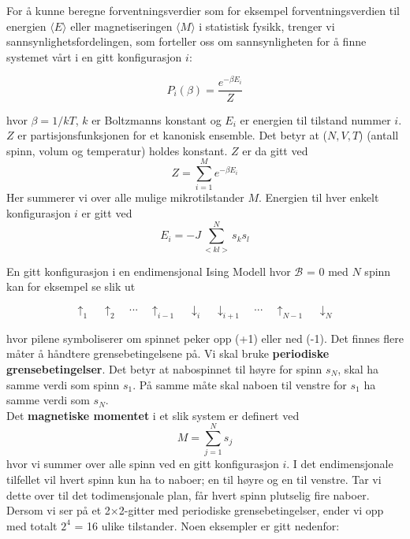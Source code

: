 \documentclass[11pt,a4paper]{article}
\begin{document}
For å kunne beregne forventningsverdier som for eksempel forventningsverdien til energien $\langle E \rangle$ eller magnetiseringen $\langle M \rangle$ i statistisk fysikk, trenger vi sannsynlighetsfordelingen, som forteller oss om sannsynligheten for å finne systemet vårt i en gitt konfigurasjon $i$:

\begin{equation}
P_i(\beta) = \frac{e^{-\beta E_i}}{Z}
\end{equation}

hvor $\beta = 1/kT$, $k$ er Boltzmanns konstant og $E_i$ er energien til tilstand nummer $i$. $Z$ er partisjonsfunksjonen for et kanonisk ensemble. Det betyr at ($N,V,T$) (antall spinn, volum og temperatur) holdes konstant. $Z$ er da gitt ved
\begin{equation}
Z = \sum_{i=1}^M e^{-\beta E_i }
\end{equation}
Her summerer vi over alle mulige mikrotilstander $M$. Energien til hver enkelt konfigurasjon $i$ er gitt ved
\begin{equation}
E_i = -J\sum_{<kl>}^N s_k s_l
\end{equation}

En gitt konfigurasjon i en endimensjonal Ising Modell hvor $\mathcal{B}$ = 0 med $N$ spinn kan for eksempel se slik ut

\[\uparrow_1 \quad \uparrow_2 \quad  ... \quad \uparrow_{i-1}  \quad \downarrow_i  \quad \downarrow_{i+1} \quad ...\quad \uparrow_{N-1} \quad \downarrow_N \]

hvor pilene symboliserer om spinnet peker opp (+1) eller ned (-1). Det finnes flere måter å håndtere grensebetingelsene på. Vi skal bruke \textbf{periodiske grensebetingelser}. Det betyr at nabospinnet til høyre for spinn $s_N$, skal ha samme verdi som spinn $s_1$. På samme måte skal naboen til venstre for $s_1$ ha samme verdi som $s_N$. \\

Det \textbf{magnetiske momentet} i et slik system er definert ved 
\begin{equation}
M = \sum_{j=1} ^N s_j
\end{equation}
hvor vi summer over alle spinn ved en gitt konfigurasjon $i$. I det endimensjonale tilfellet vil hvert spinn kun ha to naboer; en til høyre og en til venstre. Tar vi dette over til det todimensjonale plan, får hvert spinn plutselig fire naboer. Dersom vi ser på et 2$\times$2-gitter med periodiske grensebetingelser, ender vi opp med totalt $2^4$ = 16 ulike tilstander. Noen eksempler er gitt nedenfor:
\end{document}
